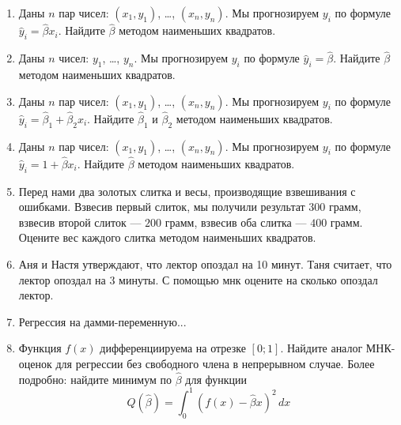\documentclass[pdftex,12pt,a4paper]{article}
\def \hb{\hat{\beta}}
\def \hy{\hat{y}}
\newcommand{\solution}[1]{}
\newcommand{\problem}[1]{#1}
\begin{document}
\begin{enumerate}
\item \problem{Даны $n$ пар чисел: $(x_1, y_1)$, \ldots, $(x_n,y_n)$. Мы прогнозируем $y_i$ по формуле $\hy_i=\hb x_i$. Найдите $\hb$ методом наименьших квадратов. }
\solution{$\hb=\sum x_i y_i/\sum x_i^2$}

\item \problem{Даны $n$ чисел: $y_1$, \ldots, $y_n$. Мы прогнозируем $y_i$ по формуле $\hy_i=\hb$. Найдите $\hb$ методом наименьших квадратов. }
\solution{$\hb=\bar{y}$}

\item \problem{Даны $n$ пар чисел: $(x_1, y_1)$, \ldots, $(x_n,y_n)$. Мы прогнозируем $y_i$ по формуле $\hy_i=\hb_1+\hb_2 x_i$. Найдите $\hb_1$ и $\hb_2$ методом наименьших квадратов. }
\solution{$\hb_2=\sum (x_i-\bar{x})(y_i-\bar{y})/\sum(x_i-\bar{x})^2$, $\hb_1=\bar{y}-\hb_2\bar{x}$}

\item \problem{Даны $n$ пар чисел: $(x_1, y_1)$, \ldots, $(x_n,y_n)$. Мы прогнозируем $y_i$ по формуле $\hy_i=1+\hb x_i$. Найдите $\hb$ методом наименьших квадратов. }
\solution{$\hb=\sum x_i (y_i-1)/\sum x_i^2$}

\item \problem{ Перед нами два золотых слитка и весы, производящие взвешивания с ошибками. Взвесив первый слиток, мы получили результат $300$ грамм, взвесив второй слиток --- $200$ грамм, взвесив оба слитка --- $400$ грамм. Оцените вес каждого слитка методом наименьших квадратов.}
\solution{ $(300-\hb_1)^2+(200-\hb_2)^2+(400-\hb_1-\hb_2)^2\to\min$ }


\item Аня и Настя утверждают, что лектор опоздал на 10 минут. Таня считает, что лектор опоздал на 3 минуты. С помощью мнк оцените на сколько опоздал лектор. 
\solution{ $2\cdot (10-\hb)^2+(3-\hb)^2\to\min$ }

\item Регрессия на дамми-переменную...



\item Функция $f(x)$ дифференциируема на отрезке $[0;1]$. Найдите аналог МНК-оценок для регрессии без свободного члена в непрерывном случае. Более подробно: найдите минимум по $\hb$ для функции
\begin{equation}
Q(\hb)= \int_0^1 (f(x)-\hb x)^2\,dx
\end{equation}
\solution{}


\end{enumerate}
\end{document}
